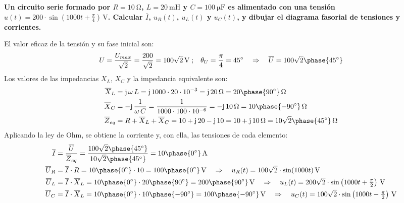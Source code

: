 \vspace{4mm}
\begin{example}\label{ej.2-3}
  \textbf{Un circuito serie formado por $R=\qty{10}{\ohm}$,
    $L=\qty{20}{\milli\henry}$ y $C=\qty{100}{\micro\farad}$ es
    alimentado con una tensión
    $u(t)=200\cdot\sin(1000t+\frac{\pi}{4})\,\si{\volt}$. Calcular
    $\overline{I}$, ${u_R(t)}$, $u_L(t)$ y $u_C(t)$, y dibujar el
    diagrama fasorial de tensiones y corrientes.}

  \vspace{4mm} El valor eficaz de la tensión y su fase inicial son:
  \begin{equation*}
    U = \dfrac{U_{max}}{\sqrt{2}} =\dfrac{200}{\sqrt{2}} = 100\sqrt2\,\si{\volt} \;;\;\;\;\theta_U=\dfrac{\pi}{4}=45^\circ \quad \Rightarrow \quad\overline{U}=100\sqrt2\phase{\ang{45}}
  \end{equation*}
  Los valores de las impedancias $X_L$, $X_C$ y la impedancia
  equivalente son:
  \begin{align*}
    \overline{X}_L&=\mathrm{j}\,\omega\,L=\mathrm{j}\,1000\cdot20\cdot 10^{-3}= \mathrm{j}\,\qty{20}{\ohm}=20\phase{\ang{90}}\,\si{\ohm}\\
    \overline{X}_C&=-\mathrm{j}\,\dfrac{1}{\omega\,C}=\dfrac{1}{1000\cdot100\cdot 10^{-6}}= -\mathrm{j}\,\qty{10}{\ohm}=10\phase{\ang{-90}}\,\si{\ohm}		\\
    \overline{Z}_{eq}&=R+\overline{X}_L+\overline{X}_C=10+\mathrm{j}\,20-\mathrm{j}\,10=10+\mathrm{j}\,10\,\si{\ohm}=10\sqrt2 \phase{\ang{45}}\,\si{\ohm}
  \end{align*}
  Aplicando la ley de Ohm, se obtiene la corriente y, con ella, las
  tensiones de cada elemento:
  \begin{align*}
    \overline{I}&=\dfrac{\overline{U}}{\overline{Z}_{eq}}=\dfrac{100\sqrt2\phase{45^\circ}}{10\sqrt2\phase{45^\circ}}=10\phase{0^\circ}\,\si{\ampere}\\
    \overline{U}_R&=\overline{I}\cdot R=10\phase{0^\circ}\cdot 10=100\phase{0^\circ}\,\si{\volt} \quad \Rightarrow \quad u_R(t)=100\sqrt{2}\cdot\sin(1000t)\,\si{\volt}\\
    \overline{U}_L&=\overline{I}\cdot \overline{X}_L=10\phase{0^\circ}\cdot 20\phase{90^\circ}=200\phase{90^\circ}\,\si{\volt} \quad \Rightarrow \quad u_L(t)=200\sqrt{2}\cdot\sin\left(1000t+\tfrac{\pi}{2}\right)\,\si{\volt}\\
    \overline{U}_C&=\overline{I}\cdot \overline{X}_L=10\phase{0^\circ}\cdot 10\phase{-90^\circ} =100\phase{-90^\circ}\,\si{\volt} \quad \Rightarrow \quad u_C(t)=100\sqrt{2}\cdot\sin\left(1000t-\tfrac{\pi}{2}\right)\,\si{\volt}

\end{align*}
\end{example}
